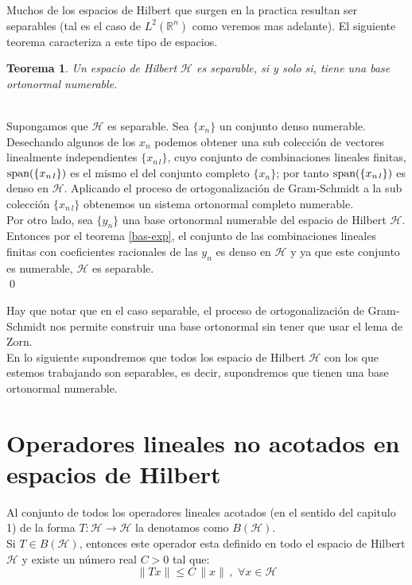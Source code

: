 \documentclass[12pt]{book}
\numberwithin{equation}{chapter}
\newtheorem{theorem}{Teorema}[chapter]
\def\n{\noindent}
\def\R{\mathbb{R}}
\def\rar{\rightarrow}
\def\H{\mathcal{H}}
\begin{document}
Muchos de los espacios de Hilbert que surgen en la practica resultan ser separables (tal es el caso de $L^{2}(\R^{n})$ como veremos mas adelante). El siguiente teorema caracteriza a este tipo de espacios.

\begin{theorem}\label{sep-bas}
Un espacio de Hilbert $\H$ es separable, si y solo si, tiene una base ortonormal numerable. 
\end{theorem}
\n {\bf Demostraci\'on}\\
Supongamos que $\H$ es separable. Sea $\{ x_{n} \}$ un conjunto denso numerable. Desechando algunos de los $x_{n}$ podemos obtener una sub colecci\'on de vectores linealmente independientes $\{ x_{n\,l} \}$, cuyo conjunto de combinaciones lineales finitas, $\hbox{span}(\{ x_{n\,l} \})$ es el mismo el del conjunto completo $\{ x_{n} \}$; por tanto $\hbox{span}(\{ x_{n\,l} \})$ es denso en $\H$. Aplicando el proceso de ortogonalizaci\'on de Gram-Schmidt a la sub colecci\'on $\{ x_{n\,l} \}$ obtenemos un sistema ortonormal completo numerable.\\

Por otro lado, sea $\{y_{n}\}$ una base ortonormal numerable del espacio de Hilbert $\H$. Entonces por el teorema \ref{bas-exp}, el conjunto de las combinaciones lineales finitas con coeficientes racionales de las $y_{n}$ es denso en $\H$ y ya que este conjunto es numerable, $\H$ es separable. \\ \qed 

\vspace{5 mm}

Hay que notar que en el caso separable, el proceso de ortogonalizaci\'on de Gram-Schmidt nos permite construir una base ortonormal sin tener que usar el lema de Zorn.\\
En lo siguiente supondremos que todos los espacio de Hilbert $\H$ con los que estemos trabajando son separables, es decir, supondremos que tienen una base ortonormal numerable. 

\newpage %

\section{Operadores lineales no acotados en espacios de Hilbert}
Al conjunto de todos los operadores lineales acotados (en el sentido del capitulo 1) de la forma $T: \H \rar \H$ la denotamos como $B(\H)$.\\
Si $T \in B(\H)$, entonces este operador esta definido en todo el espacio de Hilbert $\H$ y existe un n\'umero real $C>0$ tal que:
\begin{equation}\label{Tnorm}
\|Tx\| \leq C\,\|x\| \,,\,\,\forall x \in \H
\end{equation}
\end{document}

